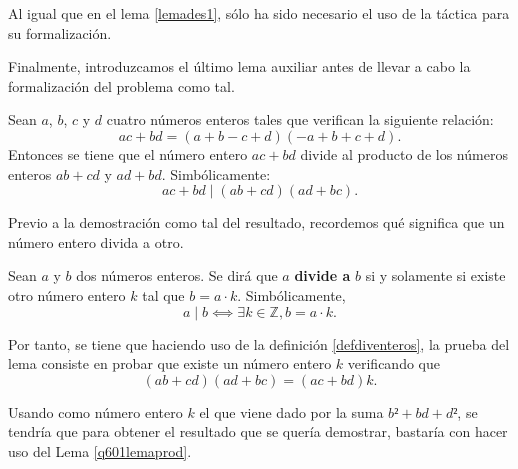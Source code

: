 
Al igual que en el lema \ref{lemades1}, sólo ha sido necesario el uso de
la táctica  para su formalización.

Finalmente, introduzcamos el último lema auxiliar antes de llevar a cabo
la formalización del problema como tal.

\begin{lema}[division]\label{lemadivisionq6}
  Sean \(a\), \(b\), \(c\) y \(d\) cuatro números enteros tales que
  verifican la siguiente relación:
    \begin{equation}\tag{h}
      ac+bd = (a+b-c+d)(-a+b+c+d).
    \end{equation}
    Entonces se tiene que el número entero \(ac+bd\) divide al producto de
    los números enteros \(ab+cd\) y \(ad+bd\). Simbólicamente:
    \begin{equation}
      ac+bd ∣ (ab+cd)(ad+bc).
    \end{equation}
\end{lema}

\begin{demostracion}
  Previo a la demostración como tal del resultado, recordemos qué significa que
  un número entero divida a otro.
  \begin{definicion}\label{defdiventeros}
    Sean \(a\) y \(b\) dos números enteros. Se dirá que \(a\)
    \textbf{divide a} \(b\) si y solamente si existe otro número entero
    \(k\) tal que \(b = a · k\).  Simbólicamente,
    \begin{equation}
    a \mid b ⟺ ∃ k ∈ ℤ, b = a · k.
    \end{equation}
  \end{definicion}

  Por tanto, se tiene que haciendo uso de la definición \ref{defdiventeros},
  la prueba del lema consiste en probar que existe un número entero \(k\)
  verificando que
  \begin{equation}
    (ab+cd)(ad+bc)=(ac+bd)k.
  \end{equation}

  Usando como número entero \(k\) el que viene dado por la suma \(b²+bd+d²\),
  se tendría que para obtener el resultado que se quería demostrar, bastaría
  con hacer uso del Lema \ref{q601lemaprod}.
\end{demostracion}

